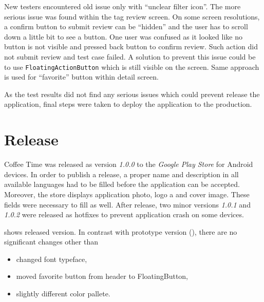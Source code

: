 New testers encountered old issue only with ``unclear filter icon''. The more serious issue was found within the tag review screen. On some screen resolutions, a confirm button to submit review can be ``hidden'' and the user has to scroll down a little bit to see a button. One user was confused as it looked like no button is not visible and pressed back button to confirm review. Such action did not submit review and test case failed. A solution to prevent this issue could be to use \verb|FloatingActionButton| which is still visible on the screen. Same approach is used for ``favorite'' button within detail screen.

As the test results did not find any serious issues which could prevent release the application, final steps were taken to deploy the application to the production.

\section{Release}
Coffee Time was released as version \textit{1.0.0} to the \textit{Google Play Store} for Android devices. In order to publish a release, a proper name and description in all available languages had to be filled before the application can be accepted. Moreover, the store displays application photo, logo a and cover image. These fields were necessary to fill as well. After release, two minor versions \textit{1.0.1} and \textit{1.0.2} were released as hotfixes to prevent application crash on some devices.

 shows released version. In contrast with prototype version (), there are no significant changes other than 

\begin{itemize}
    \item changed font typeface,
    \item moved favorite button from header to FloatingButton,
    \item slightly different color pallete.
\end{itemize}

